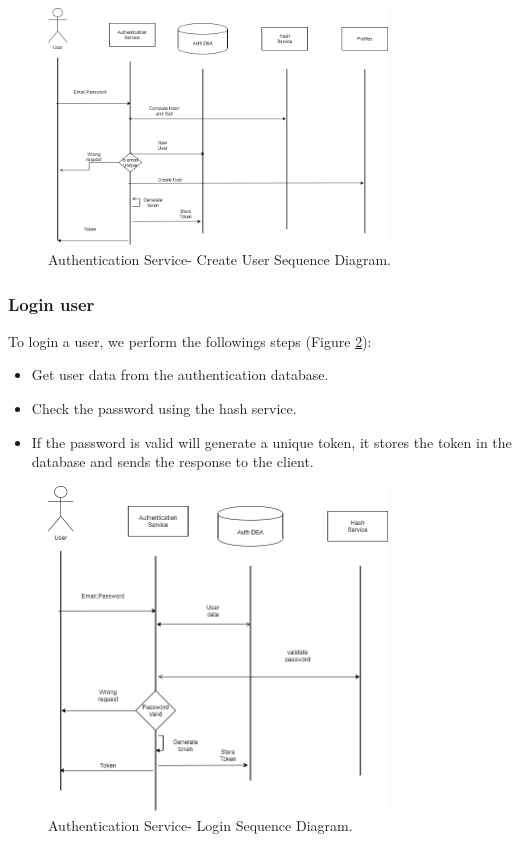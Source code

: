 \begin{figure}
\begin{center}
\includegraphics[width=90mm,scale=1]{img/auth/CreateUser_sequence.png}
\caption{Authentication Service- Create User Sequence Diagram.}
\label{auth:createusersequence}
\end{center}
\end{figure}

\subsubsection{Login user}
\indent
\indent
To login a user, we perform the followings steps (Figure \ref{auth:loginsequence}):
\begin{itemize}

\item Get user data from the authentication database.
\item	Check the password using the hash service.
\item	If the password is valid will generate a unique token, it stores the token in the database and sends the response to the client.
\end{itemize}

\begin{figure}
\begin{center}
\includegraphics[width=90mm,scale=1]{img/auth/login-sequence.png}
\caption{Authentication Service- Login Sequence Diagram.}
\label{auth:loginsequence}
\end{center}

\end{figure}


